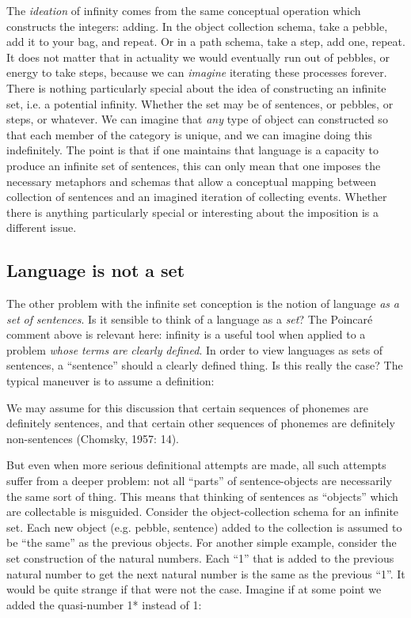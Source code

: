   The \textit{ideation} of infinity comes from the same conceptual operation which constructs the integers: adding. In the object collection schema, take a pebble, add it to your bag, and repeat. Or in a path schema, take a step, add one, repeat. It does not matter that in actuality we would eventually run out of pebbles, or energy to take steps, because we can \textit{imagine} iterating these processes forever. There is nothing particularly special about the idea of constructing an infinite set, i.e. a potential infinity. Whether the set may be of sentences, or pebbles, or steps, or whatever. We can imagine that \textit{any} type of object can constructed so that each member of the category is unique, and we can imagine doing this indefinitely. The point is that if one maintains that language is a capacity to produce an infinite set of sentences, this can only mean that one imposes the necessary metaphors and schemas that allow a conceptual mapping between collection of sentences and an imagined iteration of collecting events. Whether there is anything particularly special or interesting about the imposition is a different issue.

\subsection{Language is not a set}

The other problem with the infinite set conception is the notion of language \textit{as} \textit{a} \textit{set} \textit{of} \textit{sentences}. Is it sensible to think of a language as a \textit{set}? The Poincaré comment above is relevant here: infinity is a useful tool when applied to a problem \textit{whose} \textit{terms} \textit{are} \textit{clearly} \textit{defined}. In order to view languages as sets of sentences, a “sentence” should a clearly defined thing. Is this really the case? The typical maneuver is to assume a definition:

We may assume for this discussion that certain sequences of phonemes are definitely sentences, and that certain other sequences of phonemes are definitely non-sentences (Chomsky, 1957: 14).

  But even when more serious definitional attempts are made, all such attempts suffer from a deeper problem: not all “parts” of sentence-objects are necessarily the same sort of thing. This means that thinking of sentences as “objects” which are collectable is misguided. Consider the object-collection schema for an infinite set. Each new object (e.g. pebble, sentence) added to the collection is assumed to be “the same” as the previous objects. For another simple example, consider the set construction of the natural numbers. Each “1” that is added to the previous natural number to get the next natural number is the same as the previous “1”. It would be quite strange if that were not the case. Imagine if at some point we added the quasi-number 1* instead of 1:

